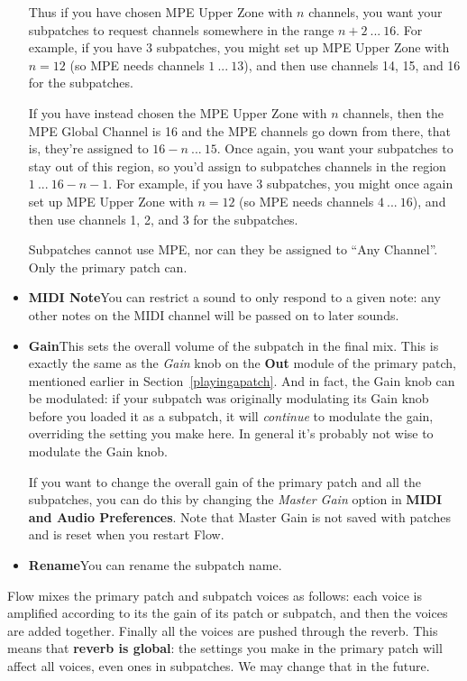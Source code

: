 \documentclass{article}
\begin{document}
\begin{itemize}
Thus if you have chosen MPE Upper Zone with \(n\) channels, you want your subpatches to request channels somewhere in the range \(n+2\ ...\ 16\).  For example, if you have 3 subpatches, you might set up MPE Upper Zone with \(n=12\) (so MPE needs channels \(1\ ...\ 13\)), and then use channels 14, 15, and 16 for the subpatches.

If you have instead chosen the MPE Upper Zone with \(n\) channels, then the MPE Global Channel is 16 and the MPE channels go down from there, that is, they're assigned to \(16 - n\ ...\ 15\). Once again, you want your subpatches to stay out of this region, so you'd assign to subpatches channels in the region \(1\ ...\ 16 - n - 1\).  For example, if you have 3 subpatches, you might once again set up MPE Upper Zone with \(n=12\) (so MPE needs channels \(4\ ...\ 16\)), and then use channels 1, 2, and 3 for the subpatches.

Subpatches cannot use MPE, nor can they be assigned to ``Any Channel''.  Only the primary patch can.

\item {\bf MIDI Note}\quad You can restrict a sound to only respond to a given note: any other notes on the MIDI channel will be passed on to later sounds.

\item {\bf Gain}\quad This sets the overall volume of the subpatch in the final mix.  This is exactly the same as the {\it Gain} knob on the {\bf Out} module of the primary patch, mentioned earlier in Section~\ref{playingapatch}.  And in fact, the Gain knob can be modulated: if your subpatch was originally modulating its Gain knob before you loaded it as a subpatch, it will {\it continue} to modulate the gain, overriding the setting you make here.  In general it's probably not  wise to modulate the Gain knob.

If you want to change the overall gain of the primary patch and all the subpatches, you can do this by changing the {\it Master Gain} option in {\bf MIDI and Audio Preferences}.   Note that Master Gain is not saved with patches and is reset when you restart Flow.

\item {\bf Rename}\quad You can rename the subpatch name.
\end{itemize}

Flow mixes the primary patch and subpatch voices as follows: each voice is amplified according to its the gain of its patch or subpatch, and then the voices are added together.  Finally all the voices are pushed through the reverb.  This means that {\bf reverb is global}: the settings you make in the primary patch will affect all voices, even ones in subpatches.  We may change that in the future.
\end{document}
